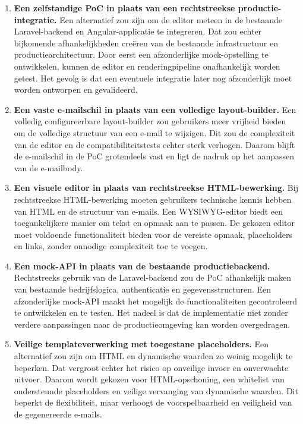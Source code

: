 \begin{enumerate}
    \item \textbf{Een zelfstandige PoC in plaats van een rechtstreekse
    productie-integratie.}
    Een alternatief zou zijn om de editor meteen in de bestaande
    Laravel-backend en Angular-applicatie te integreren. Dat zou echter
    bijkomende afhankelijkheden creëren van de bestaande infrastructuur
    en productiearchitectuur. Door eerst een afzonderlijke mock-opstelling
    te ontwikkelen, kunnen de editor en renderingpipeline onafhankelijk
    worden getest. Het gevolg is dat een eventuele integratie later nog
    afzonderlijk moet worden ontworpen en gevalideerd.

    \item \textbf{Een vaste e-mailschil in plaats van een volledige
    layout-builder.}
    Een volledig configureerbare layout-builder zou gebruikers meer vrijheid
    bieden om de volledige structuur van een e-mail te wijzigen. Dit zou
    de complexiteit van de editor en de compatibiliteitstests echter sterk
    verhogen. Daarom blijft de e-mailschil in de PoC grotendeels vast en
    ligt de nadruk op het aanpassen van de e-mailbody.

    \item \textbf{Een visuele editor in plaats van rechtstreekse
    HTML-bewerking.}
    Bij rechtstreekse HTML-bewerking moeten gebruikers technische kennis
    hebben van HTML en de structuur van e-mails. Een WYSIWYG-editor biedt
    een toegankelijkere manier om tekst en opmaak aan te passen. De gekozen
    editor moet voldoende functionaliteit bieden voor de vereiste opmaak,
    placeholders en links, zonder onnodige complexiteit toe te voegen.

    \item \textbf{Een mock-API in plaats van de bestaande productiebackend.}
    Rechtstreeks gebruik van de Laravel-backend zou de PoC afhankelijk
    maken van bestaande bedrijfslogica, authenticatie en gegevensstructuren.
    Een afzonderlijke mock-API maakt het mogelijk de functionaliteiten
    gecontroleerd te ontwikkelen en te testen. Het nadeel is dat de
    implementatie niet zonder verdere aanpassingen naar de productieomgeving
    kan worden overgedragen.

    \item \textbf{Veilige templateverwerking met toegestane placeholders.}
    Een alternatief zou zijn om HTML en dynamische waarden zo weinig
    mogelijk te beperken. Dat vergroot echter het risico op onveilige
    invoer en onverwachte uitvoer. Daarom wordt gekozen voor HTML-opschoning,
    een whitelist van ondersteunde placeholders en veilige vervanging van
    dynamische waarden. Dit beperkt de flexibiliteit, maar verhoogt de
    voorspelbaarheid en veiligheid van de gegenereerde e-mails.


\end{enumerate}
